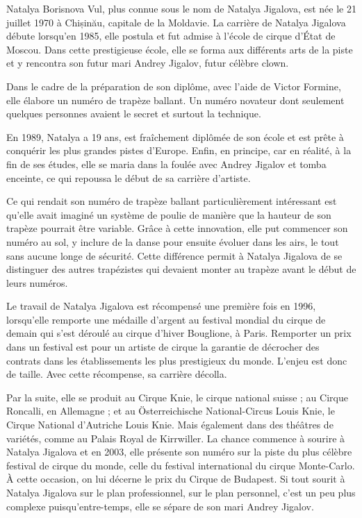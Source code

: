 Natalya Borisnova Vul, plus connue sous le nom de Natalya Jigalova, est née le 21 juillet 1970 à Chișinău, capitale de la Moldavie. La carrière de Natalya Jigalova débute lorsqu’en 1985, elle postula et fut admise à l'école de cirque d'État de Moscou. Dans cette prestigieuse école, elle se forma aux différents arts de la piste et y rencontra son futur mari Andrey Jigalov, futur célèbre clown. 

Dans le cadre de la préparation de son diplôme, avec l’aide de Victor Formine, elle élabore un numéro de trapèze ballant. Un numéro novateur dont seulement quelques personnes avaient le secret et surtout la technique.

En 1989, Natalya a 19 ans, est fraîchement diplômée de son école et est prête à conquérir les plus grandes pistes d’Europe. Enfin, en principe, car en réalité, à la fin de ses études, elle se maria dans la foulée avec Andrey Jigalov et tomba enceinte, ce qui repoussa le début de sa carrière d'artiste. 

Ce qui rendait son numéro de trapèze ballant particulièrement intéressant est qu'elle avait imaginé un système de poulie de manière que la hauteur de son trapèze pourrait être variable. Grâce à cette innovation, elle put commencer son numéro au sol, y inclure de la danse pour ensuite évoluer dans les airs, le tout sans aucune longe de sécurité. Cette différence permit à Natalya Jigalova de se distinguer des autres trapézistes qui devaient monter au trapèze avant le début de leurs numéros.

Le travail de Natalya Jigalova est récompensé une première fois en 1996, lorsqu’elle remporte une médaille d'argent au festival mondial du cirque de demain qui s’est déroulé au cirque d'hiver Bouglione, à Paris. Remporter un prix dans un festival est pour un artiste de cirque la garantie de décrocher des contrats dans les établissements les plus prestigieux du monde. L'enjeu est donc de taille. Avec cette récompense, sa carrière décolla.

Par la suite, elle se produit au Cirque Knie, le cirque national suisse ; au Cirque Roncalli, en Allemagne ; et au Österreichische National-Circus Louis Knie, le Cirque National d’Autriche Louis Knie. Mais également dans des théâtres de variétés, comme au Palais Royal de Kirrwiller. La chance commence à sourire à Natalya Jigalova et en 2003, elle présente son numéro sur la piste du plus célèbre festival de cirque du monde, celle du festival international du cirque Monte-Carlo. À cette occasion, on lui décerne le prix du Cirque de Budapest. Si tout sourit à Natalya Jigalova sur le plan professionnel, sur le plan personnel, c'est un peu plus complexe puisqu’entre-temps, elle se sépare de son mari Andrey Jigalov.

